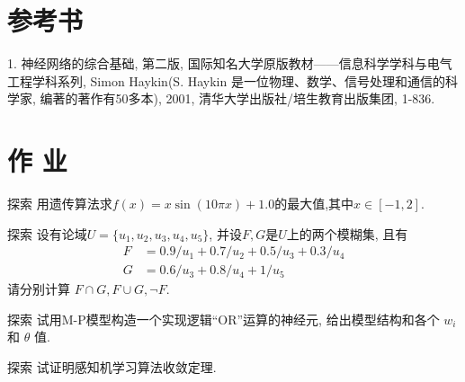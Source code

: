 \section{参考书}

1. 神经网络的综合基础, 第二版,  国际知名大学原版教材——信息科学学科与电气工程学科系列, Simon Haykin(S. Haykin 是一位物理、数学、信号处理和通信的科学家, 编著的著作有50多本), 2001, 清华大学出版社/培生教育出版集团, 1-836.
\section{作      业}
\begin{custom}[explorecolor]{探索}
    用遗传算法求$f(x)=x\sin(10πx)+1.0$的最大值,其中$x\in [-1,2]$.
\end{custom}
\begin{custom}[explorecolor]{探索}
设有论域$U=\{u_1, u_2, u_3, u_4, u_5\}$, 并设$F,G$是$U$上的两个模糊集, 且有
\begin{align*}
    F&=0.9/u_1+0.7/u_2+0.5/u_3+0.3/u_4\\
    G&=0.6/u_3+0.8/u_4+1/u_5
\end{align*}
请分别计算 $F\cap G, F\cup G,\neg F$.
\end{custom}
\begin{custom}[explorecolor]{探索}
    试用M-P模型构造一个实现逻辑``OR''运算的神经元, 给出模型结构和各个 $w_{i} $ 和 $\theta $ 值.
\end{custom}
\begin{custom}[explorecolor]{探索}
    试证明感知机学习算法收敛定理.
\end{custom}


